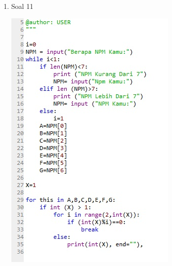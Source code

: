 \documentclass[a4paper,12pt]{report}
\begin{document}
\begin{enumerate}
\begin{center}
    \end{center}
    \item Soal 11
    \begin{center}
    \includegraphics[width=11cm\textwidth]{Figure/11.jpg}
    \end{center}
\end{enumerate}
\end{document}
